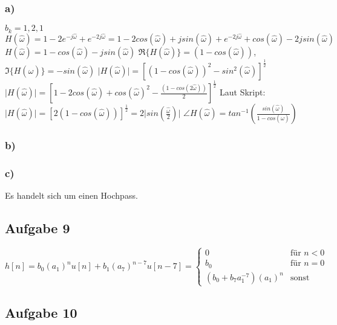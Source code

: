 \documentclass[12pt]{scrreprt}
\begin{document}
\subsubsection*{a)}
$b_k={1, 2, 1}$\newline
$H(\hat{\omega})=1-2e^{-j\hat{\omega}}+e^{-2j\hat{\omega}}=1-2cos(\hat{\omega})+ 
j sin(\hat{\omega}) + e^{-2j\hat{\omega}} + cos(\hat{\omega}) - 2j sin(\hat{\omega})$\newline
$H(\hat{\omega})=1 - cos(\hat{\omega}) - j sin(\hat{\omega})$\newline
$\Re\{H(\hat{\omega})\}=(1 - cos(\hat{\omega}))$, $\Im\{H(\hat{\omega})\}=-sin(\hat{\omega})$\newline
$\vert H(\hat{\omega}) \vert = \left[(1-cos(\hat{\omega}))^2 - sin^2(\hat{\omega})\right]^{\frac{1}{2}}$\newline
$\vert H(\hat{\omega}) \vert = \left[1-2cos(\hat{\omega}) + cos(\hat{\omega})^2 - \frac{(1-cos(2\hat{\omega}))}{2}\right]^{\frac{1}{2}}$\newline
Laut Skript:\newline
$\vert H(\hat{\omega}) \vert = \left[ 2 (1-cos(\hat{\omega}))\right]^\frac{1}{2} = 2 \vert sin(\frac{\hat{\omega}}{2})\vert$\newline
$\angle H(\hat{\omega}) = tan^{-1}\left(\frac{sin(\hat{\omega})}{1-cos(\hat{\omega})}\right)$\newline
\newline

\subsubsection*{b)}
\subsubsection*{c)}
Es handelt sich um einen Hochpass.\newline

\subsection*{Aufgabe 9}
$h[n]=b_0(a_1)^n u[n] + b_1(a_7)^{n-7} u[n-7]=
\begin{cases}
0							& \text{für } n<0\\
b_0 						& \text{für } n=0\\
(b_0 + b_7 a_1^{-7})(a_1)^n	& \text{sonst}
\end{cases}
$\newline
{}

\subsection*{Aufgabe 10}
\end{document}
